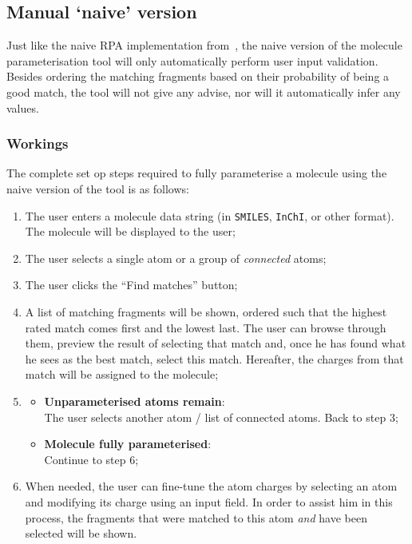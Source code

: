 \subsection{Manual `naive' version}
Just like the naive RPA implementation from~\cite{payne2000varying}, the naive version of the molecule parameterisation tool will only automatically perform user input validation. Besides ordering the matching fragments based on their probability of being a good match, the tool will not give any advise, nor will it automatically infer any values.

\subsubsection{Workings}
The complete set op steps required to fully parameterise a molecule using the naive version of the tool is as follows:
\begin{enumerate}[itemsep=.1em, parsep=.2em, topsep=0em]
\item The user enters a molecule data string (in \verb|SMILES|, \verb|InChI|, or other format). The molecule will be displayed to the user;
\item The user selects a single atom or a group of \emph{connected} atoms;
\item The user clicks the ``Find matches'' button;
\item A list of matching fragments will be shown, ordered such that the highest rated match comes first and the lowest last. The user can browse through them, preview the result of selecting that match and, once he has found what he sees as the best match, select this match. Hereafter, the charges from that match will be assigned to the molecule;
\item
\begin{itemize}[leftmargin=0cm, itemsep=.1em, parsep=.1em]
\item[]{\bf Unparameterised atoms remain}:\\The user selects another atom / list of connected atoms. Back to step 3;
\item[] {\bf Molecule fully parameterised}:\\Continue to step 6;
\end{itemize}
\item When needed, the user can fine-tune the atom charges by selecting an atom and modifying its charge using an input field. In order to assist him in this process, the fragments that were matched to this atom \emph{and} have been selected will be shown.
\end{enumerate}

